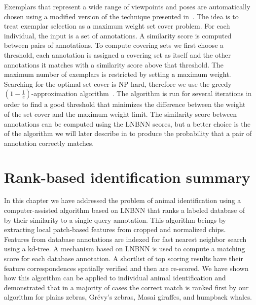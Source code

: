     Exemplars that represent a wide range of viewpoints and poses are automatically chosen using a modified version
    of the technique presented in~\cite{oddone_mobile_2016}. The idea is to treat exemplar selection as a maximum
    weight set cover problem. For each individual, the input is a set of annotations. A similarity score is
    computed between pairs of annotations. To compute covering sets we first choose a threshold, each annotation is
    assigned a covering set as itself and the other annotations it matches with a similarity score above that
    threshold. The maximum number of exemplars is restricted by setting a maximum weight. Searching for the optimal
    set cover is NP-hard, therefore we use the greedy %
    $(1 - \frac{1}{e})$-approximation algorithm~\cite{michael_guide_1979}. The algorithm is run for several
    iterations in order to find a good threshold that minimizes the difference between the weight of the set cover
    and the maximum weight limit. The similarity score between annotations can be computed using the LNBNN scores,
    but a better choice is the of the algorithm we will later describe in  to produce the
    probability that a pair of annotation correctly matches.





\section{Rank-based identification summary}\label{sec:staticsum}

    In this chapter we have addressed the problem of animal identification using a computer-assisted algorithm
      based on LNBNN that ranks a labeled database of \names{} by their similarity to a single query annotation.
    This algorithm beings by extracting local patch-based features from cropped and normalized chips.
    Features from database annotations are indexed for fast nearest neighbor search using a kd-tree.
    A mechanism based on LNBNN is used to compute a matching score for each database annotation.
    A shortlist of top scoring results have their feature correspondences spatially verified and then are
      re-scored.
    We have shown how this algorithm can be applied to individual animal identification and demonstrated that in
      a majority of cases the correct match is ranked first by our algorithm for plains zebras, Grévy's zebras,
      Masai giraffes, and humpback whales.

